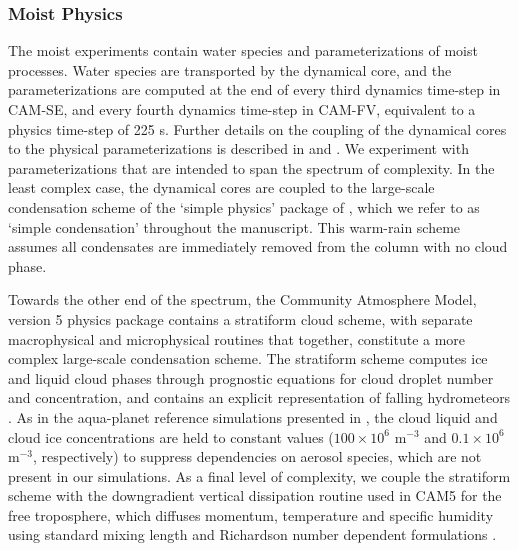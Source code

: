 \subsubsection{Moist Physics}
The moist experiments contain water species and parameterizations of moist processes. Water species are transported by the dynamical core, and the parameterizations are computed at the end of every third dynamics time-step in CAM-SE, and every fourth dynamics time-step in CAM-FV, equivalent to a physics time-step of 225 s. Further details on the coupling of the dynamical cores to the physical parameterizations is described in \cite{HR2017JCLIM} and \cite{CAM5}. We experiment with parameterizations that are intended to span the spectrum of complexity. In the least complex case, the dynamical cores are coupled to the large-scale condensation scheme of the ‘simple physics’ package of \cite{RJ2012JAMES}, which we refer to as ‘simple condensation’ throughout the manuscript. This warm-rain scheme assumes all condensates are immediately removed from the column with no cloud phase.

Towards the other end of the spectrum, the Community Atmosphere Model, version 5 physics package \citep[CAM5;][]{CAM5} contains a stratiform cloud scheme, with separate macrophysical \citep{PETAL2014JCLIM} and microphysical \citep{MG2008JC} routines that together, constitute a more complex large-scale condensation scheme. The stratiform scheme computes ice and liquid cloud phases through prognostic equations for cloud droplet number and concentration, and contains an explicit representation of falling hydrometeors \citep{MG2008JC}. As in the aqua-planet reference simulations presented in \cite{MWO2016JAMES}, the cloud liquid and cloud ice concentrations are held to constant values ($100 \times 10^6$ m$^{-3}$ and $0.1 \times 10^6$ m$^{-3}$, respectively) to suppress dependencies on aerosol species, which are not present in our simulations. As a final level of complexity, we couple the stratiform scheme with the downgradient vertical dissipation routine used in CAM5 for the free troposphere, which diffuses momentum, temperature and specific humidity using standard mixing length and Richardson number dependent formulations \citep{CAM4}.

